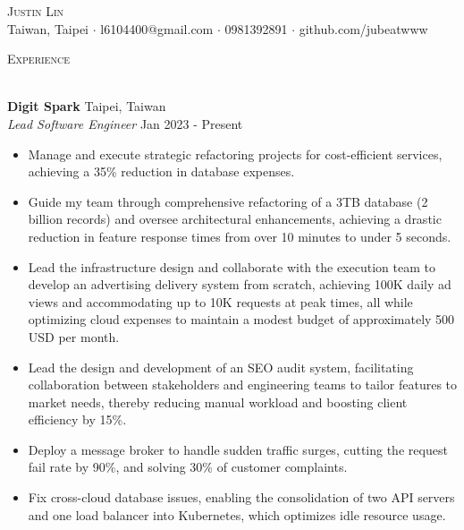 \documentclass[a4paper]{article}
\newcommand{\lineunder} {
    \vspace*{-8pt} \\
    \hspace*{-18pt} \hrulefill \\
}
\newcommand{\header} [1] {
        {\hspace*{-18pt}\vspace*{6pt} \textsc{#1}}
    \vspace*{-6pt} \lineunder
}
\begin{document}
    \vspace*{-40pt}



    \vspace*{-10pt}
    \begin{center}
    {\Huge \scshape {Justin Lin}}\\
    Taiwan, Taipei $\cdot$ l6104400@gmail.com $\cdot$ 0981392891 $\cdot$ github.com/jubeatwww\\
    \end{center}

    \header{Experience}
    \vspace{1mm}

    \textbf{Digit Spark} \hfill Taipei, Taiwan\\
    \textit{Lead Software Engineer} \hfill Jan 2023 - Present\\
    \vspace{-1mm}
    \begin{itemize} \itemsep 1pt
    \item Manage and execute strategic refactoring projects for cost-efficient services, achieving a 35\% reduction in database expenses.
    \item Guide my team through comprehensive refactoring of a 3TB database (2 billion records) and oversee architectural enhancements, achieving a drastic reduction in feature response times from over 10 minutes to under 5 seconds.
    \item Lead the infrastructure design and collaborate with the execution team to develop an advertising delivery system from scratch, achieving 100K daily ad views and accommodating up to 10K requests at peak times, all while optimizing cloud expenses to maintain a modest budget of approximately 500 USD per month.
    \item Lead the design and development of an SEO audit system, facilitating collaboration between stakeholders and engineering teams to tailor features to market needs, thereby reducing manual workload and boosting client efficiency by 15\%.
    \item Deploy a message broker to handle sudden traffic surges, cutting the request fail rate by 90\%, and solving 30\% of customer complaints.
    \item Fix cross-cloud database issues, enabling the consolidation of two API servers and one load balancer into Kubernetes, which optimizes idle resource usage.
    \end{itemize}
\end{document}
